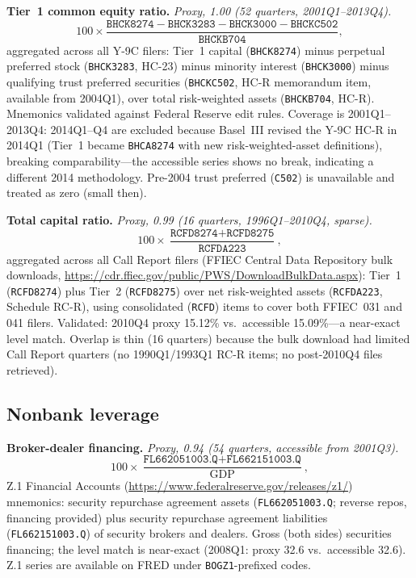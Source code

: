 \documentclass[11pt]{article}
\begin{document}
\textbf{Tier~1 common equity ratio.} \textit{Proxy, 1.00 (52 quarters,
2001Q1--2013Q4).}
\begin{equation}
100 \times \frac{\texttt{BHCK8274} - \texttt{BHCK3283}
- \texttt{BHCK3000} - \texttt{BHCKC502}}{\texttt{BHCKB704}},
\end{equation}
aggregated across all Y-9C filers: Tier~1 capital (\texttt{BHCK8274})
minus perpetual preferred stock (\texttt{BHCK3283}, HC-23) minus
minority interest (\texttt{BHCK3000}) minus qualifying trust preferred
securities (\texttt{BHCKC502}, HC-R memorandum item, available from
2004Q1), over total risk-weighted assets (\texttt{BHCKB704}, HC-R).
Mnemonics validated against Federal Reserve edit rules.  Coverage is
2001Q1--2013Q4: 2014Q1--Q4 are excluded because Basel~III revised the
Y-9C HC-R in 2014Q1 (Tier~1 became \texttt{BHCA8274} with new
risk-weighted-asset definitions), breaking comparability---the
accessible series shows no break, indicating a different 2014
methodology.  Pre-2004 trust preferred (\texttt{C502}) is unavailable
and treated as zero (small then).

\textbf{Total capital ratio.} \textit{Proxy, 0.99 (16 quarters,
1996Q1--2010Q4, sparse).}
\begin{equation}
100 \times \frac{\texttt{RCFD8274} + \texttt{RCFD8275}}
{\texttt{RCFDA223}},
\end{equation}
aggregated across all Call Report filers (FFIEC Central Data Repository
bulk downloads,
\url{https://cdr.ffiec.gov/public/PWS/DownloadBulkData.aspx}): Tier~1 (\texttt{RCFD8274}) plus Tier~2
(\texttt{RCFD8275}) over net risk-weighted assets (\texttt{RCFDA223},
Schedule RC-R), using consolidated (\texttt{RCFD}) items to cover both
FFIEC~031 and 041 filers.  Validated: 2010Q4 proxy 15.12\% vs.\
accessible 15.09\%---a near-exact level match.  Overlap is thin (16
quarters) because the bulk download had limited Call Report quarters
(no 1990Q1/1993Q1 RC-R items; no post-2010Q4 files retrieved).

\subsection{Nonbank leverage}

\textbf{Broker-dealer financing.} \textit{Proxy, 0.94 (54 quarters,
accessible from 2001Q3).}
\begin{equation}
100 \times \frac{\texttt{FL662051003.Q} + \texttt{FL662151003.Q}}
{\text{GDP}},
\end{equation}
Z.1 Financial Accounts
(\url{https://www.federalreserve.gov/releases/z1/}) mnemonics: security repurchase agreement assets
(\texttt{FL662051003.Q}; reverse repos, financing provided) plus
security repurchase agreement liabilities
(\texttt{FL662151003.Q}) of security brokers and dealers.  Gross (both
sides) securities financing; the level match is near-exact (2008Q1:
proxy 32.6 vs.\ accessible 32.6).  Z.1 series are available on FRED
under \texttt{BOGZ1}-prefixed codes.
\end{document}
